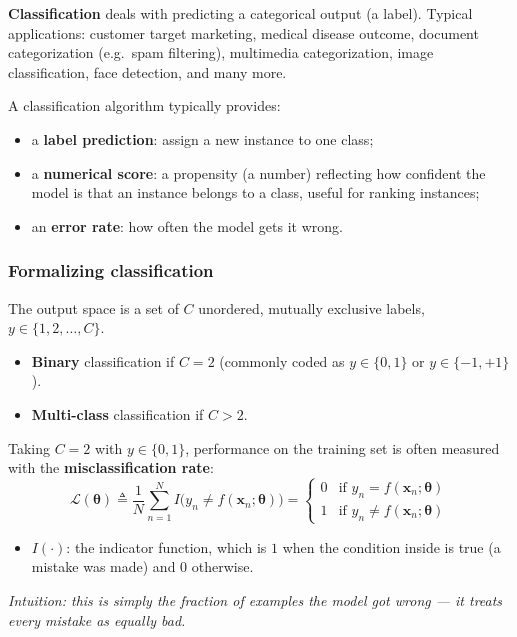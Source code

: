 \textbf{Classification} deals with predicting a categorical output (a label). Typical applications: customer target marketing, medical disease outcome, document categorization (e.g.\ spam filtering), multimedia categorization, image classification, face detection, and many more.

A classification algorithm typically provides:
\begin{itemize}
  \item a \textbf{label prediction}: assign a new instance to one class;
  \item a \textbf{numerical score}: a propensity (a number) reflecting how confident the model is that an instance belongs to a class, useful for ranking instances;
  \item an \textbf{error rate}: how often the model gets it wrong.
\end{itemize}

\subsubsection{Formalizing classification}

The output space is a set of $C$ unordered, mutually exclusive labels, $y \in \{1, 2, \dots, C\}$.
\begin{itemize}
  \item \textbf{Binary} classification if $C = 2$ (commonly coded as $y \in \{0,1\}$ or $y \in \{-1,+1\}$).
  \item \textbf{Multi-class} classification if $C > 2$.
\end{itemize}

Taking $C=2$ with $y \in \{0,1\}$, performance on the training set is often measured with the \textbf{misclassification rate}:
\[
  \mathcal{L}(\boldsymbol\theta) \triangleq \frac{1}{N}\sum_{n=1}^{N} I\bigl(y_n \neq f(\mathbf{x}_n; \boldsymbol\theta)\bigr) =
  \begin{cases}
    0 & \text{if } y_n = f(\mathbf{x}_n; \boldsymbol\theta) \\
    1 & \text{if } y_n \neq f(\mathbf{x}_n; \boldsymbol\theta)
  \end{cases}
\]
\begin{itemize}
  \item $I(\cdot)$: the indicator function, which is $1$ when the condition inside is true (a mistake was made) and $0$ otherwise.
\end{itemize}
\textit{Intuition: this is simply the fraction of examples the model got wrong — it treats every mistake as equally bad.}

